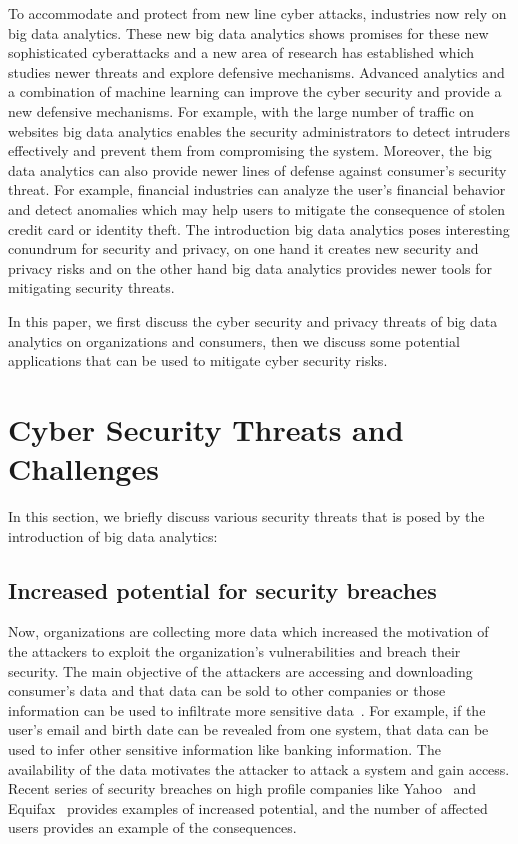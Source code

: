 \documentclass[sigconf]{acmart}
\begin{document}
To accommodate and protect from new line cyber attacks, industries now rely on big data analytics. These new big data analytics shows promises for these new sophisticated cyberattacks and a new area of research has established which studies newer threats and explore defensive mechanisms. Advanced analytics and a combination of machine learning can improve the cyber security and provide a new defensive mechanisms. For example, with the large number of traffic on websites big data analytics enables the security administrators to detect intruders effectively and prevent them from compromising the system. Moreover, the big data analytics can also provide newer lines of defense against consumer's security threat. For example, financial industries can analyze the user's financial behavior and detect anomalies which may help users to mitigate the consequence of stolen credit card or identity theft. The introduction big data analytics poses interesting conundrum for security and privacy, on one hand it creates new security and privacy risks and on the other hand big data analytics provides newer tools for mitigating security threats. 

In this paper, we first discuss the cyber security and privacy threats of big data analytics on organizations and consumers, then we discuss some potential applications that can be used to mitigate cyber security risks.

\section*{Cyber Security Threats and Challenges}
In this section, we briefly discuss various security threats that is posed by the introduction of big data analytics:

\subsection*{Increased potential for security breaches}
Now, organizations are collecting more data which increased the motivation of the attackers to exploit the organization's vulnerabilities and breach their security. The main objective of the attackers are accessing and downloading consumer's data and that data can be sold to other companies or those information can be used to infiltrate more sensitive data~\cite{Fhom15}. For example, if the user's email and birth date can be revealed from one system, that data can be used to infer other sensitive information like banking information. The availability of the data motivates the attacker to attack a system and gain access. Recent series of security breaches on high profile companies like Yahoo~\cite{yahoo} and Equifax~\cite{equifax} provides examples of increased potential, and the number of affected users provides an example of the consequences.
\end{document}
